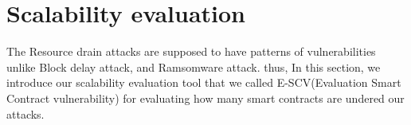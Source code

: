\chapter{Scalability evaluation}
The Resource drain attacks are supposed to have patterns of vulnerabilities unlike Block delay attack, and Ramsomware attack. thus, In this section, we introduce our scalability evaluation tool that we called E-SCV(Evaluation Smart Contract vulnerability) for evaluating how many smart contracts are undered our attacks.   




